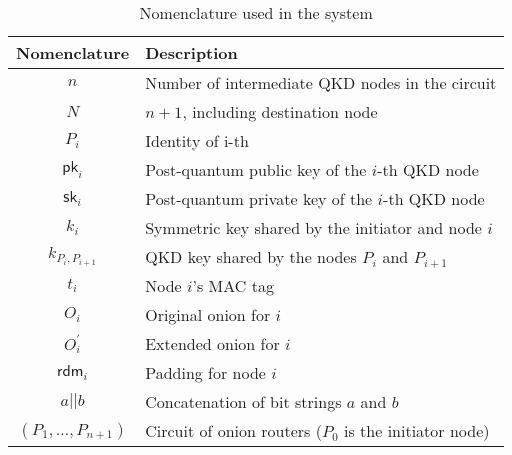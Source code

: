 \documentclass[conference]{IEEEtran}
\begin{document}
\begin{comment}
    \item Afterwards, \( N_{int,1}\) encrypts \( C'_1 \) with the QKD key it shares with \( N_{int,2}\), $Ksim_1$, signs the result (\( C_1 \)) and transmits it to \( N_{int,2}\). 
    
    \item This process is repeated successively in all the intermediate nodes until it reaches \( N_d \). As a final result, \( N_d \) receives, authenticates and decrypts; with its PQC and QKD keys $PrivK_d$ and $Ksim_m$, the incomming ciphertext \( C'_n \). Thus obtaining the secret \( S \) originally generated by \( N_i \).
\end{itemize}
\end{comment}

\begin{table}[t]
    \centering
    \renewcommand{\arraystretch}{1.3}
    \caption{Nomenclature used in the system \label{tab:nomenclature}}
    \begin{tabular}{cp{}}
        \hline
        \textbf{Nomenclature} & \textbf{Description} \\
        \hline
        $n$ & Number of intermediate QKD nodes in the circuit\\
        \hline
        $N$ & $n+1$, including destination node \\
        \hline
        $P_i$ & Identity of $\text{i-th}$ \\
        \hline
        $\mathsf{pk}_i$ & Post-quantum public key of the $i$-th QKD node \\
        \hline
        $\mathsf{sk}_i$ & Post-quantum private key of the $i$-th QKD node \\
        \hline
        $k_i$ & Symmetric key shared by the initiator and node $i$\\
        \hline
        $k_{P_i,P_{i+1}}$ & QKD key shared by the nodes $P_i$ and ${P_{i+1}}$ \\
        \hline
        $t_i$ & Node $i$'s MAC tag \\
        \hline
        $O_i$ & Original onion for $i$ \\
        \hline
        $O^\prime_i$ & Extended onion for $i$ \\
        \hline
        $\mathsf{rdm}_i$ & Padding for node $i$ \\
        \hline
        $a || b$ & Concatenation of bit strings $a$ and $b$ \\
        \hline
        $(P_1,\dots,P_{n+1})$ & Circuit of onion routers ($P_0$ is the initiator node)\\

\end{tabular}
\end{table}
\end{document}
